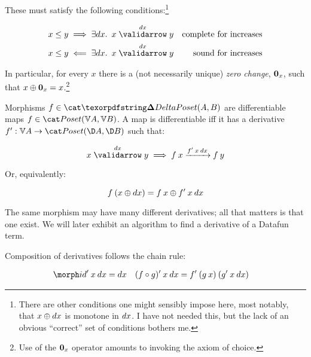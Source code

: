 \documentclass{rntz}\usepackage{fantasy}%
\begin{document}
\noindent
These must satisfy the following conditions:\footnote{There are other conditions
  one might sensibly impose here, most notably, that $x \mathbin{\oplus} dx$ is monotone in
  $dx$. I have not needed this, but the lack of an obvious ``correct'' set of
  conditions bothers me.}

\nopagebreak[2]
\begin{align*}
  x \le y &\implies \ex{\dx} \vld{\dx} x y
  & \text{complete for increases}\\
  x \le y &\impliedby \ex{\dx} \vld{\dx} x y
  & \text{sound for increases}
\end{align*}

\noindent In particular, for every $x$ there is a (not necessarily unique)
\emph{zero change}, $\boldsymbol{0}_x$, such that $x \mathbin{\oplus} \boldsymbol{0}_x = x$.\footnote{Use of
  the $\boldsymbol{0}_x$ operator amounts to invoking the axiom of choice.}

Morphisms $f \in \CP(A,B)$ are differentiable maps $f \in \Poset(\vals A, \vals
B)$. A map is differentiable iff it has a derivative $\deriv f : \vals A \to
\Poset(\chgs A, \chgs B)$ such that:

\nopagebreak[2]
\[ \vld{\dx} x y \implies \longvld{\deriv f\<x\<\dx}{f\<x}{f\<y}\]

\noindent Or, equivalently:

\nopagebreak[2]
\[ f\<(x \upd \dx) = f\<x \upd \deriv f\<x\<\dx \]


\noindent
The same morphism may have many different derivatives; all that matters is that
one exist. We will later exhibit an algorithm to find a derivative of a Datafun
term.

Composition of derivatives follows the chain rule:

\nopagebreak[2]
\begin{align*}
  \deriv\id \<x\<\dx &= \dx
  & \deriv{(f \circ g)} \<x\<\dx &= \deriv f \<(g\<x) \<(\deriv g\<x\<\dx)
\end{align*}



\end{document}
